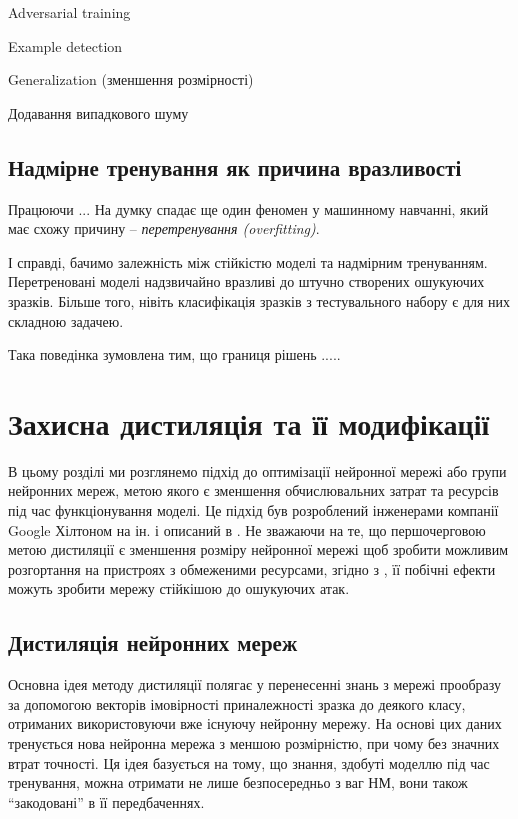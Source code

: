 \documentclass[14pt,a4paper]{extarticle}
\newcounter{e}
\numberwithin{equation}{section}
\numberwithin{figure}{section}
\begin{document}
 Adversarial training
 
 Example detection
 
 Generalization (зменшення розмірності)
 
 
 Додавання випадкового шуму
 
  
 \subsection{Надмірне тренування як причина вразливості}
 
 Працюючи ...
 На думку спадає ще один феномен у машинному навчанні, який має схожу причину -- \textit{перетренування (overfitting)}.
 
 І справді, бачимо залежність між стійкістю моделі та надмірним тренуванням. Перетреновані моделі надзвичайно вразливі до штучно створених ошукуючих зразків. Більше того, нівіть класифікація зразків з тестувального набору є для них складною задачею.
 
 Така поведінка зумовлена тим, що границя рішень .....
 
 
 
 \newpage
 \thispagestyle{empty}
 \section{Захисна дистиляція та її модифікації}
 В цьому розділі ми розглянемо підхід до оптимізації нейронної мережі або групи нейронних мереж, метою якого є зменшення обчислювальних затрат та ресурсів під час функціонування моделі. Це підхід був розроблений інженерами компанії Google Хілтоном на ін. і описаний в \cite{distillation}. Не зважаючи на те, що першочерговою метою дистиляції є зменшення розміру нейронної мережі щоб зробити можливим розгортання на пристроях з обмеженими ресурсами, згідно з \cite{defencive-distillation}, її побічні ефекти можуть зробити мережу стійкішою до ошукуючих атак.
 
 \subsection{Дистиляція нейронних мереж}
 
 Основна ідея методу дистиляції полягає у перенесенні знань з мережі прообразу за допомогою векторів імовірності приналежності зразка до деякого класу, отриманих використовуючи вже існуючу нейронну мережу. На основі цих даних тренується нова нейронна мережа з меншою розмірністю, при чому без значних втрат точності. Ця ідея базується на тому, що знання, здобуті моделлю під час тренування, можна отримати не лише безпосередньо з ваг НМ, вони також ``закодовані'' в її передбаченнях.
 
\end{document}
